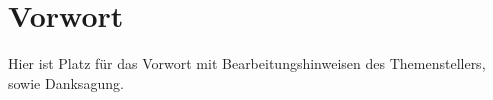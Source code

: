 \chapter{Vorwort}
Hier ist Platz für das Vorwort mit Bearbeitungshinweisen des Themenstellers, sowie Danksagung.

\blindtext